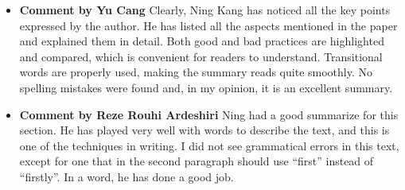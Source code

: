\documentclass[paper=a4, fontsize=11pt]{scrartcl} %
\numberwithin{equation}{section} %
\numberwithin{figure}{section} %
\numberwithin{table}{section} %
\begin{document}
		\begin{itemize}
			\item \textbf{Comment by Yu Cang} \newline
				Clearly, Ning Kang has noticed all the key points expressed by the author. He has listed all the aspects mentioned in the paper and explained them in detail. Both good and bad practices are highlighted and compared, which is convenient for readers to understand. Transitional words are properly used, making the summary reads quite smoothly. No spelling mistakes were found and, in my opinion, it is an excellent summary.
				
			\item \textbf{Comment by Reze Rouhi Ardeshiri} \newline
				Ning had a good summarize for this section. He has played very well with words to describe the text, and this is one of the techniques in writing. I did not see grammatical errors in this text, except for one that in the second paragraph should use “first” instead of “firstly”. In a word, he has done a good job.
		
		\end{itemize}
	
\end{document}
